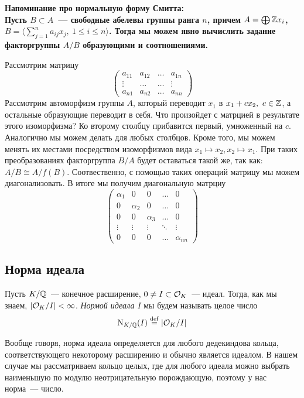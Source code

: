 	
	\noindent\bf{Напоминание про нормальную форму Смитта:}\hypertarget{smith_normal_form}{}\\
	Пусть $B \subset A$~--- свободные абелевы группы ранга $n$, причем $A = \bigoplus \mathbb{Z} x_{i}$, $B = \langle \sum_{j = 1}^{n} a_{i j} x_{j}, \ 1 \le i \le n \rangle$.  Тогда мы можем явно вычислить задание факторгруппы $A/B$ образующими и соотношениями. 

	Рассмотрим матрицу 
	\[
		\begin{pmatrix} a_{11} & a_{12} & \ldots & a_{1n} \\ \vdots & \ldots & \ldots & \vdots \\ a_{n 1} & a_{n 2} & \ldots & a_{n n} \end{pmatrix}
	\]
	Рассмотрим автоморфизм группы $A$, который переводит $x_{1}$ в $x_{1} + c x_{2}, \ c \in \mathbb{Z}$, а остальные образующие переводит в себя. 
	Что произойдет с матрцией в результате этого изоморфизма?  Ко второму столбцу прибавится первый, умноженный на $c$.  Аналогично мы можем делать для любых столбцов. Кроме того, мы можем менять их местами посредством изоморфизмов вида $x_{1} \mapsto x_{2}, x_{2} \mapsto x_{1}$. При таких преобразованиях факторгруппа $B/A$ будет оставаться такой же, так как: $A/B \cong A / f(B)$. Соотвественно, с помощью таких операций матрицу мы можем диагонализовать. В итоге мы получим диагональную матрциу 
	\[
		\begin{pmatrix} \alpha_{1} & 0 & 0 & \ldots & 0 \\ 0 & \alpha_{2} & 0 & \ldots & 0 \\ 0 & 0 & \alpha_{3} & \ldots &  0  \\ \vdots & \vdots & \vdots & \ddots & \vdots  \\ 0 & 0 & 0 & \ldots & \alpha_{nn}\end{pmatrix}
	\]

	\subsection{Норма идеала}

	\begin{definition} 
		Пусть $K/\mathbb{Q}$~--- конечное расширение, $0 \neq I \subset \mathcal{O}_{K}$~--- идеал. Тогда, как мы знаем, $|\mathcal{O}_{K}/I| < \infty$. \emph{Нормой идеала $I$} мы будем называть целое число
		\[
			\mathrm{N}_{K/\Q}\lr*{I} \eqdef \left\lvert \cO_{K} / I \right\rvert
		\]
	\end{definition}

	\begin{remark}
		Вообще говоря, норма идеала определяется для любого дедекиндова кольца, соответствующего некоторому расширению и обычно является идеалом. В нашем случае мы рассматриваем кольцо целых, где для любого идеала можно выбрать наименьшую по модулю неотрицательную порождающую, поэтому у нас норма~--- число. 
	\end{remark}

